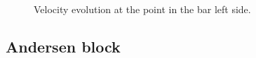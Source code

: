 \documentclass[preprint,12pt,a4paper]{elsarticle}
\begin{document}
\begin{figure}\sidecaption
  \centering
  \caption{Velocity evolution at the point in the bar left side.}
  \label{fig:Dyka-OTM-MPM}
\end{figure}

\subsection{Andersen block}
\label{sec:andersen-block}
\end{document}

